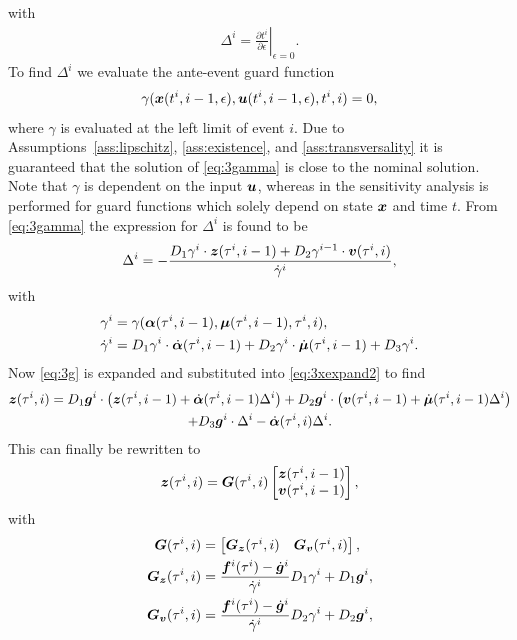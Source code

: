 \documentclass[../DC2017114Bouma.tex]{subfiles}
\begin{document}
with
\begin{align}
\Delta^{i} = \left.\frac{\partial t^{i}}{\partial\epsilon}\right|_{\epsilon=0}.\label{eq:3Delta}
\end{align}
To find $\Delta^{i}$ we evaluate the ante-event guard function
\begin{align}
\gamma({\boldsymbol{x}}(t^{i},i-1,\epsilon),{\boldsymbol{u}}(t^{i},i-1,\epsilon),t^{i},i) = 0,\label{eq:3gamma}
\end{align}
where $\gamma$ is evaluated at the left limit of event $i$. Due to Assumptions~\ref{ass:lipschitz}, \ref{ass:existence}, and \ref{ass:transversality} it is guaranteed that the solution of \eqref{eq:3gamma} is close to the nominal solution. Note that $\gamma$ is dependent on the input ${\boldsymbol{u}}$, whereas in \cite{Chen2018a} the sensitivity analysis is performed for guard functions which solely depend on state ${\boldsymbol{x}}$ and time $t$. From \eqref{eq:3gamma} the expression for $\Delta^{i}$ is found to be
\begin{align}
\Delta^{i} = -\frac{D_1\gamma^{i}\cdot{\boldsymbol{z}}(\tau^i,i-1) + D_2\gamma^{i-1}\cdot{\boldsymbol{v}}(\tau^i,i)}{\dot{\gamma}^{i}},\label{eq}
\end{align}
with
\begin{align}
\gamma^i &= \gamma(\boldsymbol{\alpha}(\tau^i,i-1),\boldsymbol{\mu}(\tau^i,i-1),\tau^i,i),\\
\dot{\gamma}^i &= D_1\gamma^i\cdot\dot{\boldsymbol{\alpha}}(\tau^i,i-1) + D_2\gamma^i\cdot\dot{\boldsymbol{\mu}}(\tau^i,i-1) + D_3\gamma^i.
\end{align}
Now \eqref{eq:3g} is expanded and substituted  into \eqref{eq:3xexpand2} to find
\begin{multline}
{\boldsymbol{z}}(\tau^i,i) = D_1{\boldsymbol{g}}^i\cdot\left({\boldsymbol{z}}(\tau^i,i-1) + \dot{\boldsymbol{\alpha}}(\tau^i,i-1)\Delta^i\right) + D_2{\boldsymbol{g}}^i\cdot\left({\boldsymbol{v}}(\tau^i,i-1) + \dot{\boldsymbol{\mu}}(\tau^i,i-1)\Delta^i\right)\\ + D_3{\boldsymbol{g}}^i\cdot\Delta^i - \dot{\boldsymbol{\alpha}}(\tau^i,i)\Delta^i.
\end{multline}
This can finally be rewritten to
\begin{align}
{\boldsymbol{z}}(\tau^i,i) = {\boldsymbol{G}}(\tau^i,i)\begin{bmatrix}
{\boldsymbol{z}}(\tau^i,i-1) \\ {\boldsymbol{v}}(\tau^i,i-1)
\end{bmatrix},
\end{align}
with 
\begin{align}
{\boldsymbol{G}}(\tau^i,i) &= \begin{bmatrix}
{\boldsymbol{G}}_{{\boldsymbol{z}}}(\tau^i,i) & {\boldsymbol{G}}_{{\boldsymbol{v}}}(\tau^i,i)
\end{bmatrix},\\
{\boldsymbol{G}}_{{\boldsymbol{z}}}(\tau^i,i) & = \frac{{\boldsymbol{f}}^i(\tau^i) - \dot{{\boldsymbol{g}}}^i}{\dot{\gamma}^i}D_1\gamma^i + D_1{\boldsymbol{g}}^i,\\
{\boldsymbol{G}}_{{\boldsymbol{v}}}(\tau^i,i) & = \frac{{\boldsymbol{f}}^i(\tau^i) - \dot{{\boldsymbol{g}}}^i}{\dot{\gamma}^i}D_2\gamma^i + D_2{\boldsymbol{g}}^i,
\end{align}
\end{document}

